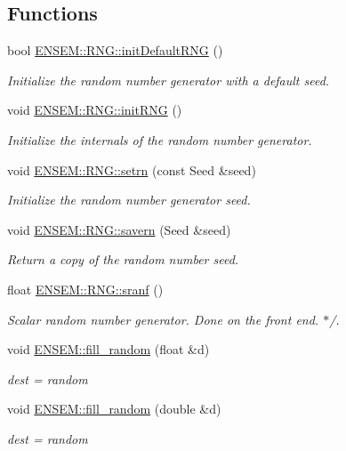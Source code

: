 \subsection*{Functions}
\begin{DoxyCompactItemize}
\item 
bool \mbox{\hyperlink{namespaceENSEM_1_1RNG_a4a7ec2d430ab092440b9c3b2b5fd9e64}{E\+N\+S\+E\+M\+::\+R\+N\+G\+::init\+Default\+R\+NG}} ()
\begin{DoxyCompactList}\small\item\em Initialize the random number generator with a default seed. \end{DoxyCompactList}\item 
void \mbox{\hyperlink{namespaceENSEM_1_1RNG_a69ee665fc3157b2080c75a027343d449}{E\+N\+S\+E\+M\+::\+R\+N\+G\+::init\+R\+NG}} ()
\begin{DoxyCompactList}\small\item\em Initialize the internals of the random number generator. \end{DoxyCompactList}\item 
void \mbox{\hyperlink{namespaceENSEM_1_1RNG_ad0ec5508fb072a32d96927e5b752164a}{E\+N\+S\+E\+M\+::\+R\+N\+G\+::setrn}} (const Seed \&seed)
\begin{DoxyCompactList}\small\item\em Initialize the random number generator seed. \end{DoxyCompactList}\item 
void \mbox{\hyperlink{namespaceENSEM_1_1RNG_a5e6a21d205da8a5f8bf3c4732ab5d358}{E\+N\+S\+E\+M\+::\+R\+N\+G\+::savern}} (Seed \&seed)
\begin{DoxyCompactList}\small\item\em Return a copy of the random number seed. \end{DoxyCompactList}\item 
float \mbox{\hyperlink{namespaceENSEM_1_1RNG_a169ccd1627df1ad9983c4ce344d0e36a}{E\+N\+S\+E\+M\+::\+R\+N\+G\+::sranf}} ()
\begin{DoxyCompactList}\small\item\em Scalar random number generator. Done on the front end. $\ast$/. \end{DoxyCompactList}\item 
void \mbox{\hyperlink{namespaceENSEM_a6b1e92930b4fcb2ce1fa31cfd98c3e15}{E\+N\+S\+E\+M\+::fill\+\_\+random}} (float \&d)
\begin{DoxyCompactList}\small\item\em dest = random \end{DoxyCompactList}\item 
void \mbox{\hyperlink{namespaceENSEM_a6ff7a31a0fb5d175a3065b60f365fa0d}{E\+N\+S\+E\+M\+::fill\+\_\+random}} (double \&d)
\begin{DoxyCompactList}\small\item\em dest = random \end{DoxyCompactList}\end{DoxyCompactItemize}
